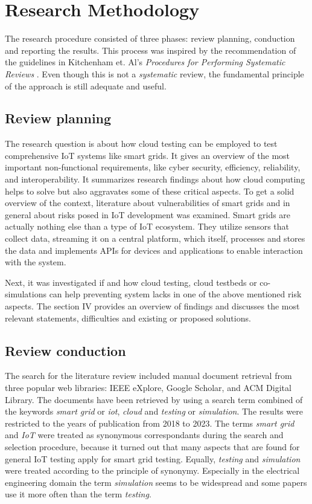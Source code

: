 \section{Research Methodology}
The research procedure consisted of three phases: review planning, conduction and reporting the results. This process was inspired by the recommendation of the guidelines in Kitchenham et. Al's \textit{Procedures for Performing Systematic Reviews} \cite{kitchenham2004procedures}. Even though this is not a \textit{systematic} review, the fundamental principle of the approach is still adequate and useful.

\subsection{Review planning}
The research question is about how cloud testing can be employed to test comprehensive IoT systems like smart grids. It gives an overview of the most important non-functional requirements, like cyber security, efficiency, reliability, and interoperability. It summarizes research findings about how cloud computing helps to solve but also aggravates some of these critical aspects. To get a solid overview of the context, literature about vulnerabilities of smart grids and in general about risks posed in IoT development was examined. Smart grids are actually nothing else than a type of IoT ecosystem. They utilize sensors that collect data, streaming it on a central platform, which itself, processes and stores the data and implements APIs for devices and applications to enable interaction with the system. 

Next, it was investigated if and how cloud testing, cloud testbeds or co-simulations can help preventing system lacks in one of the above mentioned risk aspects. The section IV provides an overview of findings and discusses the most relevant statements, difficulties and existing or proposed solutions.

\subsection{Review conduction}

The search for the literature review included manual document retrieval from three popular web libraries: IEEE eXplore, Google Scholar, and ACM Digital Library. The documents have been retrieved by using a search term combined of the keywords \textit{smart grid} or \textit{iot}, \textit {cloud} and \textit{testing} or \textit{simulation}. The results were restricted to the years of publication from 2018 to 2023. The terms \textit{smart grid} and \textit{IoT} were treated as synonymous correspondants during the search and selection procedure, because it turned out that many aspects that are found for general IoT testing apply for smart grid testing. Equally, \textit{testing} and \textit{simulation} were treated according to the principle of synonymy. Especially in the electrical engineering domain the term \textit{simulation} seems to be widespread and some papers use it more often than the term \textit{testing}.

